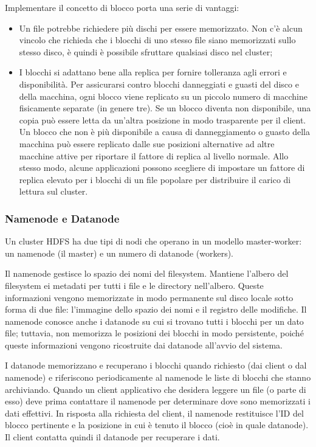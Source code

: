 \documentclass{article}
\begin{document}
Implementare il concetto di blocco porta una serie di vantaggi:
\begin{itemize}
    \item Un file potrebbe richiedere più dischi per essere memorizzato. Non c'è alcun vincolo che richieda che i blocchi di uno stesso file siano memorizzati sullo stesso disco, è quindi è possibile sfruttare qualsiasi disco nel cluster;
    \item I blocchi si adattano bene alla replica per fornire tolleranza agli errori e disponibilità.  Per assicurarsi contro blocchi danneggiati e guasti del disco e della macchina, ogni blocco viene replicato su un piccolo numero di macchine fisicamente separate (in genere tre). Se un blocco diventa non disponibile, una copia può essere letta da un'altra posizione in modo trasparente per il client. Un blocco che non è più disponibile a causa di danneggiamento o guasto della macchina può essere replicato dalle sue posizioni alternative ad altre macchine attive per riportare il fattore di replica al livello normale.  Allo stesso modo, alcune applicazioni possono scegliere di impostare un fattore di replica elevato per i blocchi di un file popolare per distribuire il carico di lettura sul cluster.
\end{itemize}

\subsubsection{Namenode e Datanode}

Un cluster HDFS ha due tipi di nodi che operano in un modello master-worker: un namenode (il master) e un numero di datanode (workers). 

Il namenode gestisce lo spazio dei nomi del filesystem. Mantiene l'albero del filesystem ei metadati per tutti i file e le directory nell'albero. Queste informazioni vengono memorizzate in modo permanente sul disco locale sotto forma di due file: l'immagine dello spazio dei nomi e il registro delle modifiche. Il namenode conosce anche i datanode su cui si trovano tutti i blocchi per un dato file; tuttavia, non memorizza le posizioni dei blocchi in modo persistente, poiché queste informazioni vengono ricostruite dai datanode all'avvio del sistema. 

I datanode memorizzano e recuperano i blocchi quando richiesto (dai client o dal namenode) e riferiscono periodicamente al namenode le liste di blocchi che stanno archiviando. Quando un client applicativo che desidera leggere un file (o parte di esso) deve prima contattare il namenode per determinare dove sono memorizzati i dati effettivi. In risposta alla richiesta del client, il namenode restituisce l'ID del blocco pertinente e la posizione in cui è tenuto il blocco (cioè in quale datanode). Il client contatta quindi il datanode per recuperare i dati. 
\end{document}
